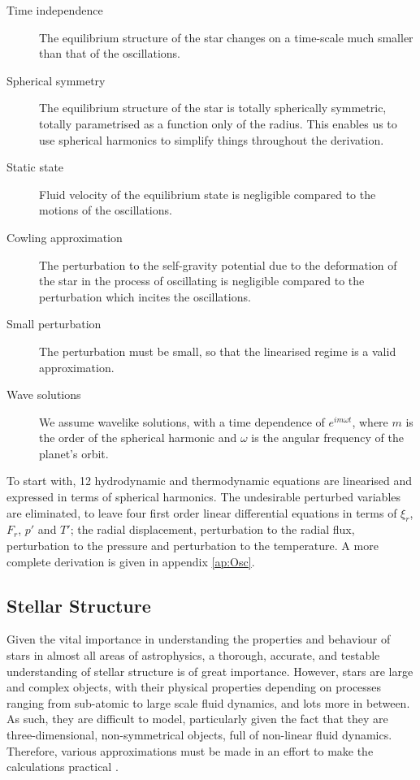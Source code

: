 \documentclass[11pt]{amsart}
\begin{document}
\begin{description}
\item[Time independence]
 The equilibrium structure of the star changes on a time-scale much smaller than that of the oscillations.
 
 \item[Spherical symmetry]
 The equilibrium structure of the star is totally spherically symmetric, totally parametrised as a function only of the radius.  This enables us to use spherical harmonics to simplify things throughout the derivation.
 
 \item[Static state]
 Fluid velocity of the equilibrium state is negligible compared to the motions of the oscillations.
 
 \item[Cowling approximation]
 The perturbation to the self-gravity potential due to the deformation of the star in the process of oscillating is negligible compared to the perturbation which incites the oscillations.
 
 \item[Small perturbation]
 The perturbation must be small, so that the linearised regime is a valid approximation.
 
 \item[Wave solutions]
 We assume wavelike solutions, with a time dependence of $e^{i m \omega t}$, where $m$ is the order of the spherical harmonic and $\omega$ is the angular frequency of the planet's orbit.
\end{description}


To start with, 12 hydrodynamic and thermodynamic equations are linearised and expressed in terms of spherical harmonics. The undesirable perturbed variables are eliminated, to leave four first order linear differential equations in terms of $\xi_{r}$, $F_{r}$, $p'$ and $T'$; the radial displacement, perturbation to the radial flux, perturbation to the pressure and perturbation to the temperature.  A more complete derivation is given in appendix \ref{ap:Osc}.





\subsection{Stellar Structure} \label{Intro:StellarStruc}

Given the vital importance in understanding the properties and behaviour of stars in almost all areas of astrophysics, a thorough, accurate, and testable understanding of stellar structure is of great importance.  However, stars are large and complex objects, with their physical properties depending on processes ranging from sub-atomic to large scale fluid dynamics, and lots more in between.  As such, they are difficult to model, particularly given the fact that they are three-dimensional, non-symmetrical objects, full of non-linear fluid dynamics.  Therefore, various approximations must be made in an effort to make the calculations practical \cite{Paxton2011}.
\end{document}
